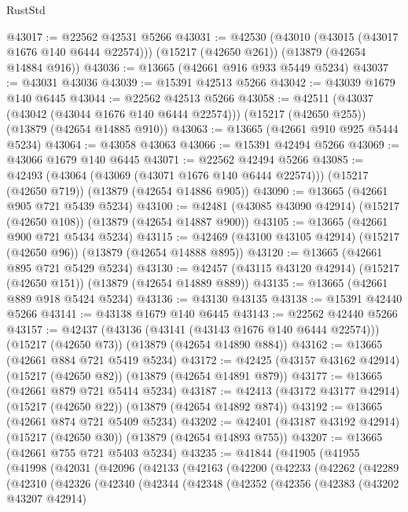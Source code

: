 \begin{lexlean}{RustStd}
\begin{coremodule}
@43017 := @22562 @42531 @5266
@43031 := @42530
    (@43010 (@43015 (@43017 @1676 @140 @6444 @22574)))
    (@15217 (@42650 @261))
    (@13879 (@42654 @14884 @916))
@43036 := @13665 (@42661 @916 @933 @5449 @5234)
@43037 := @43031 @43036
@43039 := @15391 @42513 @5266
@43042 := @43039 @1679 @140 @6445
@43044 := @22562 @42513 @5266
@43058 := @42511
    (@43037 (@43042 (@43044 @1676 @140 @6444 @22574)))
    (@15217 (@42650 @255))
    (@13879 (@42654 @14885 @910))
@43063 := @13665 (@42661 @910 @925 @5444 @5234)
@43064 := @43058 @43063
@43066 := @15391 @42494 @5266
@43069 := @43066 @1679 @140 @6445
@43071 := @22562 @42494 @5266
@43085 := @42493
    (@43064 (@43069 (@43071 @1676 @140 @6444 @22574)))
    (@15217 (@42650 @719))
    (@13879 (@42654 @14886 @905))
@43090 := @13665 (@42661 @905 @721 @5439 @5234)
@43100 := @42481 (@43085 @43090 @42914) (@15217 (@42650 @108)) (@13879 (@42654 @14887 @900))
@43105 := @13665 (@42661 @900 @721 @5434 @5234)
@43115 := @42469 (@43100 @43105 @42914) (@15217 (@42650 @96)) (@13879 (@42654 @14888 @895))
@43120 := @13665 (@42661 @895 @721 @5429 @5234)
@43130 := @42457 (@43115 @43120 @42914) (@15217 (@42650 @151)) (@13879 (@42654 @14889 @889))
@43135 := @13665 (@42661 @889 @918 @5424 @5234)
@43136 := @43130 @43135
@43138 := @15391 @42440 @5266
@43141 := @43138 @1679 @140 @6445
@43143 := @22562 @42440 @5266
@43157 := @42437
    (@43136 (@43141 (@43143 @1676 @140 @6444 @22574)))
    (@15217 (@42650 @73))
    (@13879 (@42654 @14890 @884))
@43162 := @13665 (@42661 @884 @721 @5419 @5234)
@43172 := @42425 (@43157 @43162 @42914) (@15217 (@42650 @82)) (@13879 (@42654 @14891 @879))
@43177 := @13665 (@42661 @879 @721 @5414 @5234)
@43187 := @42413 (@43172 @43177 @42914) (@15217 (@42650 @22)) (@13879 (@42654 @14892 @874))
@43192 := @13665 (@42661 @874 @721 @5409 @5234)
@43202 := @42401 (@43187 @43192 @42914) (@15217 (@42650 @30)) (@13879 (@42654 @14893 @755))
@43207 := @13665 (@42661 @755 @721 @5403 @5234)
@43235 := @41844
    (@41905
      (@41955
        (@41998
          (@42031
            (@42096
              (@42133
                (@42163
                  (@42200
                    (@42233
                      (@42262
                        (@42289
                          (@42310
                            (@42326
                              (@42340
                                (@42344
                                  (@42348
                                    (@42352
                                      (@42356
                                        (@42383
                                          (@43202 @43207 @42914)

\end{coremodule}
\end{lexlean}
